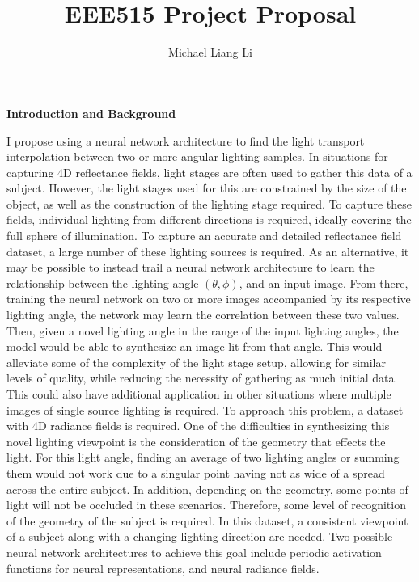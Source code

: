 \documentclass[12pt,twoside]{article}
\title{\textbf{\doctitle}\\
EEE515 Project Proposal}
\author{Michael Liang Li}
\begin{document}
\thispagestyle{empty}

\maketitle

	\noindent\textbf{Introduction and Background}

	I propose using a neural network architecture to find the light transport interpolation between two or more angular lighting samples. In situations for capturing 4D reflectance fields, light stages are often used to gather this data of a subject. However, the light stages used for this are constrained by the size of the object, as well as the construction of the lighting stage required. To capture these fields, individual lighting from different directions is required, ideally covering the full sphere of illumination. To capture an accurate and detailed reflectance field dataset, a large number of these lighting sources is required. As an alternative, it may be possible to instead trail a neural network architecture to learn the relationship between the lighting angle $(\theta, \phi)$, and an input image. From there, training the neural network on two or more images accompanied by its respective lighting angle, the network may learn the correlation between these two values. Then, given a novel lighting angle in the range of the input lighting angles, the model would be able to synthesize an image lit from that angle. This would alleviate some of the complexity of the light stage setup, allowing for similar levels of quality, while reducing the necessity of gathering as much initial data. This could also have additional application in other situations where multiple images of single source lighting is required. To approach this problem, a dataset with 4D radiance fields is required. One of the difficulties in synthesizing this novel lighting viewpoint is the consideration of the geometry that effects the light. For this light angle, finding an average of two lighting angles or summing them would not work due to a singular point having not as wide of a spread across the entire subject. In addition, depending on the geometry, some points of light will not be occluded in these scenarios. Therefore, some level of recognition of the geometry of the subject is required. In this dataset, a consistent viewpoint of a subject along with a changing lighting direction are needed. Two possible neural network architectures to achieve this goal include periodic activation functions for neural representations, and neural radiance fields. 
	
\end{document}
